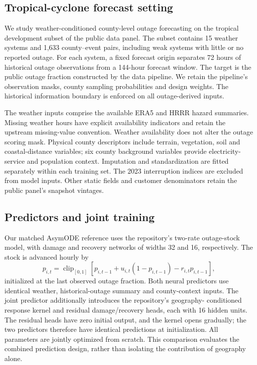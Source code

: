 \subsection{Tropical-cyclone forecast setting}
We study weather-conditioned county-level outage forecasting on the tropical
development subset of the public data panel. The subset contains 15 weather
systems and 1,633 county--event pairs, including weak systems with little or no
reported outage. For each system, a fixed forecast origin separates 72 hours
of historical outage observations from a 144-hour forecast window. The target
is the public outage fraction constructed by the data pipeline. We retain the
pipeline's observation masks, county sampling probabilities and design weights.
The historical information boundary is enforced on all outage-derived inputs.

The weather inputs comprise the available ERA5 and HRRR hazard summaries.
Missing weather hours have explicit availability indicators and retain the
upstream missing-value convention. Weather availability does not alter the
outage scoring mask. Physical county descriptors include terrain, vegetation,
soil and coastal-distance variables; six county background variables provide
electricity-service and population context. Imputation and standardization
are fitted separately within each training set. The 2023 interruption indices
are excluded from model inputs. Other static fields and customer denominators
retain the public panel's snapshot vintages.

\subsection{Predictors and joint training}
Our matched AsymODE reference uses the repository's two-rate outage-stock
model, with damage and recovery networks of widths 32 and 16, respectively.
The stock is advanced hourly by
\begin{equation}
 p_{i,t}=\operatorname{clip}_{[0,1]}
 \left[p_{i,t-1}+u_{i,t}(1-p_{i,t-1})-r_{i,t}p_{i,t-1}\right],
\end{equation}
initialized at the last observed outage fraction. Both neural predictors use
identical weather, historical-outage summary and county-context inputs.
The joint predictor additionally introduces the repository's geography-
conditioned response kernel and residual damage/recovery heads, each with
16 hidden units. The residual heads have zero initial output, and the kernel
opens gradually; the two predictors therefore have identical predictions at
initialization. All parameters are jointly optimized from scratch.
This comparison evaluates the combined prediction design, rather than
isolating the contribution of geography alone.

